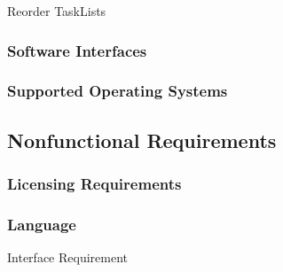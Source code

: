     \begin{requirement}{Reorder TaskLists}
    \end{requirement}

	
	\subsubsection{Software Interfaces}
	\label{requirements:interfaces:software}



    \subsubsection{Supported Operating Systems}
    \label{requirements:os}

\subsection{Nonfunctional Requirements}
\label{requirements:nonfunctional}

    \subsubsection{Licensing Requirements}
    \label{requirements:nonfunctional_start}
    \label{requirements:license}


    \subsubsection{Language}
    \label{requirements:language}


    \begin{requirement}{Interface Requirement}
    \end{requirement}



